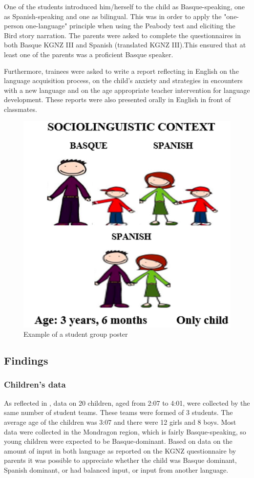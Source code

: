 \documentclass[output=paper]{../langscibook}
\begin{document}
One of the students introduced him/herself to the child as Basque-speaking, one as Spanish-speaking and one as bilingual. This was in order to apply the "one-person one-language" principle when using the Peabody test and eliciting the Bird story narration. The parents were asked to complete the questionnaires in both Basque KGNZ III and Spanish (translated KGNZ III).This ensured that at least one of the parents was a proficient Basque speaker.

Furthermore, trainees were asked to write a report reflecting in English on the language acquisition process, on the child’s anxiety and strategies in encounters with a new language and on the age appropriate teacher intervention for language development. These reports were also presented orally in English in front of classmates.


\begin{figure}
  \includegraphics[width=.5\textwidth]{figures/Chapter6-img002-Edited.jpg}
  \caption{Example of a student group poster}
\end{figure}


\subsection{Findings}
\subsubsection{Children’s data}

As reflected in , data on 20 children, aged from 2:07 to 4:01, were collected by the same number of student teams. These teams were formed of 3 students. The average age of the children was 3:07 and there were 12 girls and 8 boys. Most data were collected in the Mondragon region, which is fairly Basque-speaking, so young children were expected to be Basque-dominant. Based on data on the amount of input in both language as reported on the KGNZ questionnaire by parents it was possible to appreciate whether the child was Basque dominant, Spanish dominant, or had balanced input, or input from another language.
\end{document}
